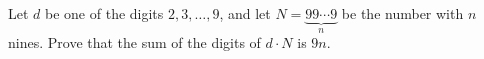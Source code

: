 Let $d$ be one of the digits $2,3,\dots,9$, and let $N=\underbrace{99\cdots9}_{n}$ be the number with $n$ nines. Prove that the sum of the digits of $d\cdot N$ is $9n$.
